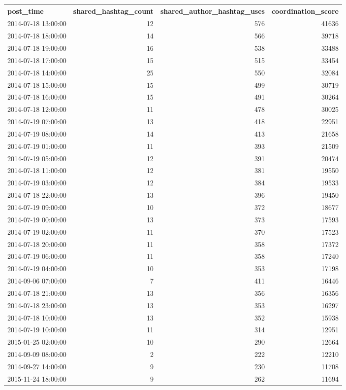 \begin{tabular}{lrrr}
\toprule
post\_time & shared\_hashtag\_count & shared\_author\_hashtag\_uses & coordination\_score \\
\midrule
2014-07-18 13:00:00 & 12 & 576 & 41636 \\
2014-07-18 18:00:00 & 14 & 566 & 39718 \\
2014-07-18 19:00:00 & 16 & 538 & 33488 \\
2014-07-18 17:00:00 & 15 & 515 & 33454 \\
2014-07-18 14:00:00 & 25 & 550 & 32084 \\
2014-07-18 15:00:00 & 15 & 499 & 30719 \\
2014-07-18 16:00:00 & 15 & 491 & 30264 \\
2014-07-18 12:00:00 & 11 & 478 & 30025 \\
2014-07-19 07:00:00 & 13 & 418 & 22951 \\
2014-07-19 08:00:00 & 14 & 413 & 21658 \\
2014-07-19 01:00:00 & 11 & 393 & 21509 \\
2014-07-19 05:00:00 & 12 & 391 & 20474 \\
2014-07-18 11:00:00 & 12 & 381 & 19550 \\
2014-07-19 03:00:00 & 12 & 384 & 19533 \\
2014-07-18 22:00:00 & 13 & 396 & 19450 \\
2014-07-19 09:00:00 & 10 & 372 & 18677 \\
2014-07-19 00:00:00 & 13 & 373 & 17593 \\
2014-07-19 02:00:00 & 11 & 370 & 17523 \\
2014-07-18 20:00:00 & 11 & 358 & 17372 \\
2014-07-19 06:00:00 & 11 & 358 & 17240 \\
2014-07-19 04:00:00 & 10 & 353 & 17198 \\
2014-09-06 07:00:00 & 7 & 411 & 16446 \\
2014-07-18 21:00:00 & 13 & 356 & 16356 \\
2014-07-18 23:00:00 & 13 & 353 & 16297 \\
2014-07-18 10:00:00 & 13 & 352 & 15938 \\
2014-07-19 10:00:00 & 11 & 314 & 12951 \\
2015-01-25 02:00:00 & 10 & 290 & 12664 \\
2014-09-09 08:00:00 & 2 & 222 & 12210 \\
2014-09-27 14:00:00 & 9 & 230 & 11708 \\
2015-11-24 18:00:00 & 9 & 262 & 11694 \\

\end{tabular}
